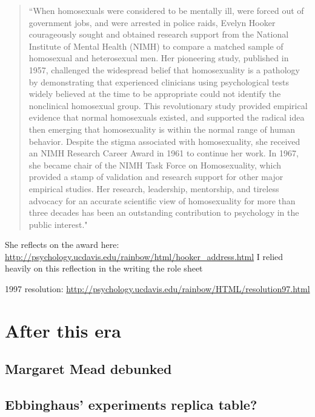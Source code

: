 \begin{refsection}
\begin{quote}

“When homosexuals were considered to be mentally ill, were forced out of government jobs, and were arrested in police raids, Evelyn Hooker courageously sought and obtained research support from the National Institute of Mental Health (NIMH) to compare a matched sample of homosexual and heterosexual men. Her pioneering study, published in 1957, challenged the widespread belief that homosexuality is a pathology by demonstrating that experienced clinicians using psychological tests widely believed at the time to be appropriate could not identify the nonclinical homosexual group. This revolutionary study provided empirical evidence that normal homosexuals existed, and supported the radical idea then emerging that homosexuality is within the normal range of human behavior. Despite the stigma associated with homosexuality, she received an NIMH Research Career Award in 1961 to continue her work. In 1967, she became chair of the NIMH Task Force on Homosexuality, which provided a stamp of validation and research support for other major empirical studies. Her research, leadership, mentorship, and tireless advocacy for an accurate scientific view of homosexuality for more than three decades has been an outstanding contribution to psychology in the public interest."
\end{quote}

She reflects on the award here: \url{http://psychology.ucdavis.edu/rainbow/html/hooker_address.html} I relied heavily on this reflection in the writing the role sheet

1997 resolution: \url{http://psychology.ucdavis.edu/rainbow/HTML/resolution97.html}

\section{After this era}
\label{afterthisera}

\subsection{Margaret Mead debunked}
\label{margaretmeaddebunked}

\subsection{Ebbinghaus’ experiments replica table?}
\label{ebbinghaus’experimentsreplicatable}


\end{refsection}
